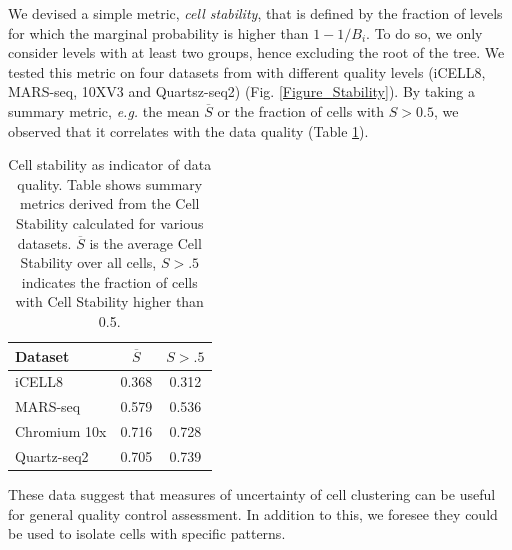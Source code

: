 \documentclass[10pt]{article}
\begin{document}
We devised a simple metric, \emph{cell stability}, that is defined by the fraction of levels for which the marginal probability is higher than $1-1/B_i$. To do so, we only consider levels with at least two groups, hence excluding the root of the tree. We tested this metric on four datasets from \cite{mereu_2020} with different quality levels (iCELL8, MARS-seq, 10XV3 and Quartsz-seq2) (Fig. \ref{Figure_Stability}). By taking a summary metric, \emph{e.g.} the mean $\overline{S}$ or the fraction of cells with $S>0.5$, we observed that it correlates with the data quality (Table \ref{table_stability}).

\begin{table}[h!]
\centering
 \begin{tabular}{|| l c c ||}
 \hline
 \textbf{Dataset} & \textbf{$\overline{S}$} & \textbf{$S > .5$} \\ [0.5ex] 

 \hline\hline
 iCELL8 \cite{mereu_2020} & 0.368 & 0.312  \\
 \hline
 MARS-seq \cite{mereu_2020} & 0.579 & 0.536  \\
 \hline
 Chromium 10x \cite{mereu_2020} & 0.716 & 0.728  \\
 \hline
 Quartz-seq2 \cite{mereu_2020} & 0.705 & 0.739 \\
 \hline
\end{tabular}
\caption{Cell stability as indicator of data quality. Table shows summary metrics derived from the Cell Stability calculated for various datasets. $\overline{S}$ is the average Cell Stability over all cells, $S>.5$ indicates the fraction of cells with Cell Stability higher than 0.5.}
\label{table_stability}
\end{table}

These data suggest that measures of uncertainty of cell clustering can be useful for general quality control assessment. In addition to this, we foresee they could be used to isolate cells with specific patterns.

\end{document}
